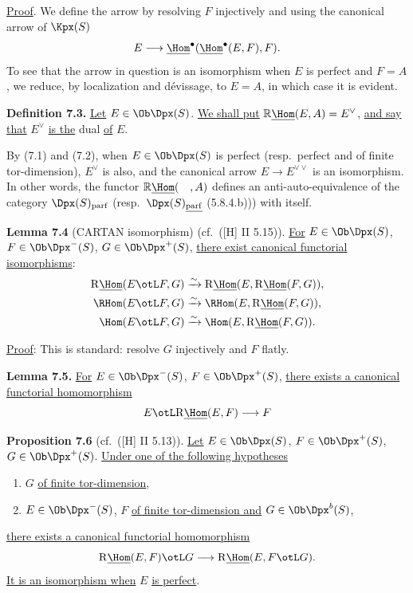 %
\uline{Proof}. We define the arrow by resolving \(F\) injectively and using the canonical arrow of \(\Kpx(S)\)
\[
  E\longrightarrow\underline{\Hom}^\bullet(\underline{\Hom}^\bullet(E,F),F).
\]
To see that the arrow in question is an isomorphism when \(E\) is perfect and \(F=A\), we reduce, by localization and dévissage, to \(E=A\), in which case it is evident.

\textbf{Definition 7.3.} \uline{Let} \(E\in\Ob\Dpx(S)\). \uline{We shall put} \(\mathbb{R}\underline{\Hom}(E,A)=E^\vee\), \uline{and say that} \(E^\vee\) \uline{is the} dual \uline{of} \(E\).

By (7.1) and (7.2), when \(E\in\Ob\Dpx(S)\) is perfect (resp.\ perfect and of finite tor-dimension), \(E^\vee\) is also, and the canonical arrow \(E\to E^{\vee\vee}\) is an isomorphism. In other words, the functor \(\mathbb{R}\underline{\Hom}(\quad,A)\) defines an anti-auto-equivalence of the category \(\Dpx(S)_{\mathrm{parf}}\) (resp.\ \(\Dpx(S)_{\underline{\mathrm{parf}}}\) (5.8.4.b))) with itself.

\textbf{Lemma 7.4} (CARTAN isomorphism) (cf.\ ([H] II 5.15)). \uline{For} \(E\in\Ob\Dpx(S)\), \(F\in\Ob\Dpx^-(S)\), \(G\in\Ob\Dpx^+(S)\), \uline{there exist canonical functorial isomorphisms}:
\[
\begin{aligned}
\mathrm R\underline{\Hom}(E\otL F,G)&\xrightarrow{\sim}\mathrm R\underline{\Hom}(E,\mathrm R\underline{\Hom}(F,G)),\\
\RHom(E\otL F,G)&\xrightarrow{\sim}\RHom(E,\mathrm R\underline{\Hom}(F,G)),\\
\Hom(E\otL F,G)&\xrightarrow{\sim}\Hom(E,\mathrm R\underline{\Hom}(F,G)).
\end{aligned}
\]

%
\uline{Proof}: This is standard: resolve \(G\) injectively and \(F\) flatly.

\textbf{Lemma 7.5.} \uline{For} \(E\in\Ob\Dpx^-(S)\), \(F\in\Ob\Dpx^+(S)\), \uline{there exists a canonical functorial homomorphism}
\[
  E\otL\mathrm R\underline{\Hom}(E,F)\longrightarrow F
\]

\textbf{Proposition 7.6} (cf.\ ([H] II 5.13)). \uline{Let} \(E\in\Ob\Dpx(S)\), \(F\in\Ob\Dpx^+(S)\), \(G\in\Ob\Dpx^+(S)\). \uline{Under one of the following hypotheses}
\begin{enumerate}[label=\roman*)]
\item \(G\) \uline{of finite tor-dimension},
\item \(E\in\Ob\Dpx^-(S)\), \(F\) \uline{of finite tor-dimension and} \(G\in\Ob\Dpx^b(S)\),
\end{enumerate}
\uline{there exists a canonical functorial homomorphism}
\[
  \mathrm R\underline{\Hom}(E,F)\otL G
  \longrightarrow
  \mathrm R\underline{\Hom}(E,F\otL G).
\]
\uline{It is an isomorphism when} \(E\) \uline{is perfect}.


